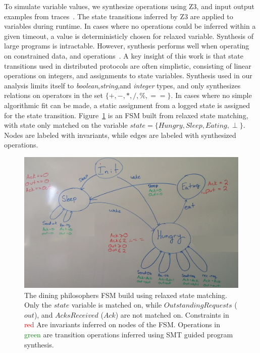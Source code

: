 To simulate variable values, we synthesize operations using Z3, and input
output examples from traces~\cite{SMTSynth}. The state transitions inferred by
Z3 are applied to variables during runtime. In cases where no operations could
be inferred within a given timeout, a value is deterministicly chosen for
relaxed variable. Synthesis of large programs is intractable. However,
synthesis performs well when operating on constrained data, and
operations~\cite{Torlak:2013:GSL:2509578.2509586,automating-string-processing-spreadsheets-using-input-output-examples}.
A key insight of this work is that state transitions used in distributed
protocols are often simplistic, consisting of linear operations on integers, and
assignments to state variables. Synthesis used in our analysis limits itself to
\emph{boolean},\emph{string},and \emph{integer} types, and only synthesizes
relations on operators in the set $\{+,-,*,/,\%,==\}$. In cases where no simple
algorithmic fit can be made, a static assignment from a logged state is
assigned for the state transition.  Figure~\ref{fig:relaxedfsm} is an FSM built
from relaxed state matching, with state only matched on the variable $state =
\{Hungry,Sleep,Eating,\perp\}$. Nodes are labeled with invariants, while edges are
labeled with synthesized operations.

\begin{figure}
    \includegraphics[width=\textwidth]{fig/relaxed}

    \caption{The dining philosophers FSM build using relaxed state matching.
    Only the $state$ variable is matched on, while $OutstandingRequests$
    ($out$), and $AcksReceived$ ($Ack$) are not matched on. Constraints in
    \textcolor{red}{red} Are invariants inferred on nodes of the FSM.
    Operations in \textcolor{green}{green} are transition operations inferred
    using SMT guided program synthesis.
    \label{fig:relaxedfsm}
    }

\end{figure}


